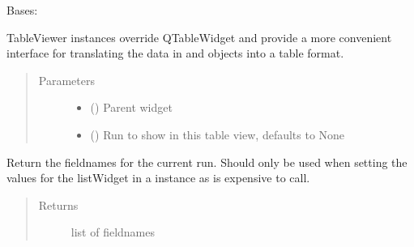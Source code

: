 \documentclass[letterpaper,10pt,english]{sphinxmanual}
\begin{document}
\begin{fulllineitems}
\label{\detokenize{polo.widgets:polo.widgets.table_viewer.TableViewer}}
Bases: 

TableViewer instances override QTableWidget and provide a
more convenient interface for translating the data in  and  
objects into a table format.
\begin{quote}\begin{description}
\item[{Parameters}] \leavevmode\begin{itemize}
\item {} 
 () \textendash{} Parent widget

\item {} 
 ({\hyperref[\detokenize{polo.crystallography:polo.crystallography.run.Run}]{}}\sphinxstyleliteralemphasis{\sphinxupquote{, }}) \textendash{} Run to show in this table view, defaults to None

\end{itemize}

\end{description}\end{quote}

\begin{fulllineitems}
\label{\detokenize{polo.widgets:polo.widgets.table_viewer.TableViewer.fieldnames}}
Return the fieldnames for the current run. Should only be
used when setting the values for the listWidget in a 
instance as is expensive to call.
\begin{quote}\begin{description}
\item[{Returns}] \leavevmode
list of fieldnames


\end{description}
\end{quote}
\end{fulllineitems}
\end{fulllineitems}
\end{document}
